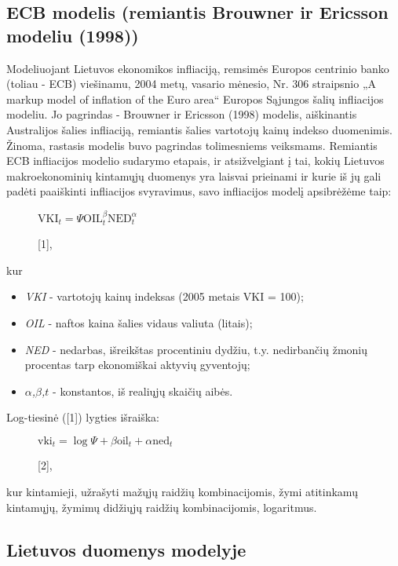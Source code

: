 \documentclass[a4paper]{article}
\begin{document}
	\subsection{ECB modelis (remiantis Brouwner ir Ericsson modeliu (1998))}
		
Modeliuojant Lietuvos ekonomikos infliaciją, remsimės Europos centrinio banko (toliau - ECB) viešinamu, 2004 metų, vasario mėnesio, Nr. 306 straipsnio „A markup model of inflation of  the Euro area“ Europos Sąjungos šalių infliacijos modeliu. Jo  pagrindas -  Brouwner ir Ericsson (1998) modelis, aiškinantis Australijos šalies infliaciją, remiantis šalies vartotojų kainų indekso duomenimis. Žinoma, rastasis modelis buvo pagrindas tolimesniems veiksmams. Remiantis ECB infliacijos modelio sudarymo etapais, ir atsižvelgiant į tai, kokių Lietuvos makroekonominių kintamųjų duomenys yra laisvai prieinami ir kurie iš jų gali padėti paaiškinti infliacijos svyravimus, savo infliacijos modelį apsibrėžėme taip:

\begin{figure}[hc]
\centering
$\text{VKI}_t = \Psi \text{OIL}^\beta_t \text{NED}^\alpha_t$
\caption{[1],}
\end{figure}

\noindent kur

\begin{itemize}
\item \textit{VKI} - vartotojų kainų indeksas (2005 metais VKI = 100);
\item \textit{OIL} - naftos kaina šalies vidaus valiuta (litais);
\item \textit{NED} - nedarbas, išreikštas procentiniu dydžiu, t.y. nedirbančių žmonių procentas tarp ekonomiškai aktyvių gyventojų;
\item \textit{$\alpha$,$\beta$,$t$} - konstantos, iš realiųjų skaičių aibės.
\end{itemize}
 


\noindent Log-tiesinė ([1]) lygties išraiška:

\begin{figure}[!h]
\centering
$\text{vki}_t = \log{\Psi} + \beta \text{oil}_t + \alpha \text{ned}_t$
\caption{[2],}
\end{figure}

\noindent kur  kintamieji, užrašyti mažųjų raidžių kombinacijomis, žymi atitinkamų kintamųjų, žymimų didžiųjų raidžių kombinacijomis, logaritmus.

\newpage	
	\subsection{Lietuvos duomenys modelyje}
	
\end{document}
